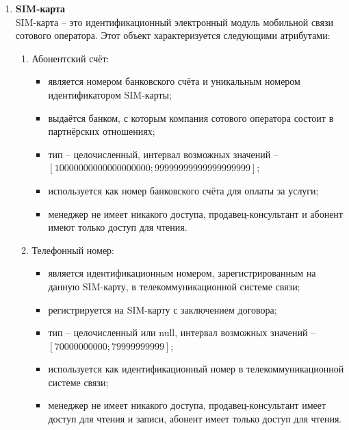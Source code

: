 \begin{enumerate}
    \item \textbf{SIM-карта} \\
    SIM-карта -- это идентификационный электронный модуль мобильной связи сотового оператора. Этот объект характеризуется следующими атрибутами:
    \begin{enumerate}
        \item Абонентский счёт:
        \begin{itemize}
            \item является номером банковского счёта и уникальным номером идентификатором SIM-карты;
            \item выдаётся банком, с которым компания сотового оператора состоит в партнёрских отношениях;
            \item тип -- целочисленный, интервал возможных значений -- $[10000000000000000000; 99999999999999999999]$;
            \item используется как номер банковского счёта для оплаты за услуги;
            \item менеджер не имеет никакого доступа, продавец-консультант и абонент имеют только доступ для чтения.
        \end{itemize}

        \item Телефонный номер:
        \begin{itemize}
            \item является идентификационным номером, зарегистрированным на данную SIM-карту, в телекоммуникационной системе связи;
            \item регистрируется на SIM-карту с заключением договора;
            \item тип -- целочисленный или null, интервал возможных значений -- $[70000000000; 79999999999]$;
            \item используется как идентификационный номер в телекоммуникационной системе связи;
            \item менеджер не имеет никакого доступа, продавец-консультант имеет доступ для чтения и записи, абонент имеет только доступ для чтения.
        \end{itemize}


\end{enumerate}
\end{enumerate}

